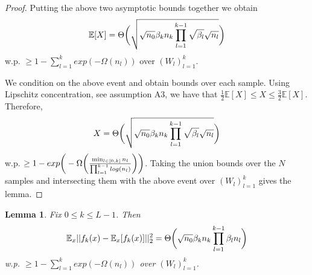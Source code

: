 \documentclass{article}
\theoremstyle{plain}
\newtheorem{lemma}[Theorem]{Lemma}
\theoremstyle{definition}
\theoremstyle{remark}
\begin{document}
\begin{proof}
Putting the above two asymptotic bounds together we obtain
\begin{equation*}
	\mathbb{E}[X] = \Theta\bigg{(}
	\sqrt{\sqrt{n_0}\beta_kn_k\prod_{l=1}^{k-1}\sqrt{\beta_l}\sqrt{n_l}}
	\bigg{)}
\end{equation*}
w.p. $\geq 1 - \sum_{l=1}^kexp(-\Omega(n_l))$ over $(W_l)_{l=1}^k$.

We condition on the above event and obtain bounds over each sample.
Using Lipschitz concentration, see assumption A3, we have that
$\frac{1}{2}\mathbb{E}[X] \leq X \leq \frac{3}{2}\mathbb{E}[X]$. Therefore, 
\begin{equation*}
X = \Theta\bigg{(}
\sqrt{\sqrt{n_0}\beta_kn_k\prod_{l=1}^{k-1}\sqrt{\beta_l}\sqrt{n_l}}
\bigg{)}
\end{equation*}
w.p. $\geq 1 - exp\bigg{(}-\Omega \bigg{(} 
\frac{\min_{l\in [0,k]}n_l}{\prod_{l=1}^{k-1}log(n_l)}
\bigg{)}
\bigg{)}$. Taking the union bounds over the $N$ samples and intersecting them with the above event over $(W_l)_{l=1}^k$ gives the lemma.
\end{proof}



\begin{lemma}\label{c4}
Fix $0\leq k \leq L-1$. Then 
\begin{equation*}
	\mathbb{E}_x\vert\vert f_k(x) - \mathbb{E}_x[f_k(x)]\vert\vert_2^2 = 
	\Theta\bigg{(}
	\sqrt{n_0}\beta_kn_k\prod_{l=1}^{k-1}\beta_ln_l
	\bigg{)}
\end{equation*}
w.p. $\geq 1 - \sum_{l=1}^{k}exp(-\Omega(n_l))$ over $(W_l)_{l=1}^k$.
\end{lemma}
\end{document}

